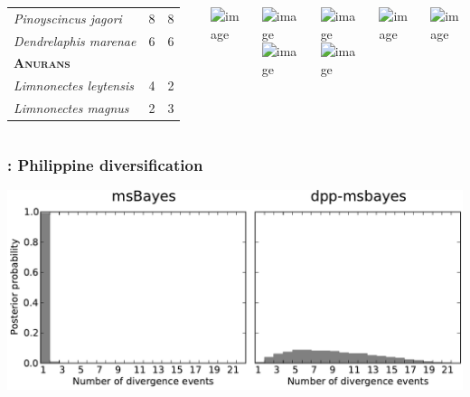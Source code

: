 \begin{frame}
\begin{columns}[c]
\begin{table}
\begin{tabular}{ l c c }
                \emph{Pinoyscincus jagori}          & 8  & 8  \\
                \emph{Dendrelaphis marenae}         & 6  & 6  \\
                \textbf{\textsc{Anurans}}  & & \\
                \emph{Limnonectes leytensis}        & 4  & 2  \\
                \emph{Limnonectes magnus}           & 2  & 3  \\
                \hline
            \end{tabular}
        \end{table}
        \centerline{
        \includegraphics<1>[height=1.5cm]{images/photos/crocidura-negrina-JAEsselstyn.jpg}}
        \centerline{
        \includegraphics<1>[height=1.5cm]{images/photos/hipposideros-obscurus-MRMDuya.jpg}
        \hspace{0.3mm}
        \includegraphics<1>[height=1.5cm]{images/photos/haplonycteris-fischeri-JHolden.jpg}}
        \centerline{
        \includegraphics<1>[height=1.5cm]{images/photos/gekko-mindorensis.jpg}
        \hspace{0.3mm}
        \includegraphics<1>[height=1.5cm]{images/photos/sphenomorphus-arborens-rmb.jpg}}
        \centerline{
        \includegraphics<1>[height=1.5cm]{images/photos/dendrelaphis-pictus-cds.jpg}}
        \centerline{
        \includegraphics<1>[height=1.5cm]{images/photos/limnonectes-leytensis-rmb.jpg}}
\end{columns}
\end{frame}

\begin{frame}
    \frametitle{\dppmsbayes: Philippine diversification}
    \includegraphics[width=\textwidth]{../empirical-analyses/plots/philippines-dpp-psi-posterior-old-vs-dpp.pdf}
\end{frame}

